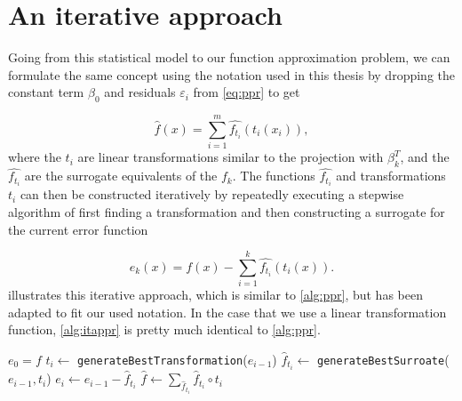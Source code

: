 \documentclass[
  a4paper,  %
  twoside,  %
  bibliography=totoc,
  headsepline,
  cleardoublepage=empty,
  parskip=half,
  draft=false
]{scrbook}
\begin{document}
\section{An iterative approach}

Going from this statistical model to our function approximation problem, we can formulate the same concept using the notation used in this thesis by dropping the constant term $\beta_0$ and residuals $\varepsilon_i$ from \cref{eq:ppr} to get

\begin{equation}
\hat{f}(x)=\sum_{i=1}^m \hat{f_{t_i}}(t_i(x_i)),
\nonumber
\end{equation}
%
where the $t_i$ are linear transformations similar to the projection with $\beta_k^T$, and the $\hat{f_{t_i}}$ are the surrogate equivalents of the $f_k$.
The functions $\hat{f_{t_i}}$ and transformations $t_i$ can then be constructed iteratively by repeatedly executing a stepwise algorithm of first finding a transformation and then constructing a surrogate for the current error function

\begin{equation}
e_k(x)=f(x) - \sum_{i=1}^k \hat{f_{t_i}}(t_i(x)).
\nonumber
\end{equation}
%
 illustrates this iterative approach, which is similar to \cref{alg:ppr}, but has been adapted to fit our used notation.
In the case that we use a linear transformation function, \cref{alg:itappr} is pretty much identical to \cref{alg:ppr}.

\begin{mdframed}[style=algstyle,frametitle={\textbf{function} \texttt{transformedSurrogateSum}{$(f, i_{\text{max}})$}}]
\normalsize
\vspace{5.5mm}
\begin{algorithmic}[1]
    \State $e_0 = f$
    	\State $t_i \gets$ \texttt{generateBestTransformation}($e_{i - 1}$)
    	\State $\hat{f}_{t_i} \gets$ \texttt{generateBestSurroate}($e_{i - 1}, t_i$)
    	\State $e_i \gets e_{i - 1} - \hat{f}_{t_i}$
    \EndFor
    \State $\hat{f} \gets \sum_{\hat{f}_{t_i}} \hat{f}_{t_i} \circ t_i$
    \State {}
\end{algorithmic}
\vspace{-1.5mm}
\delimit
	\label{alg:itappr}
\end{mdframed}
\end{document}
